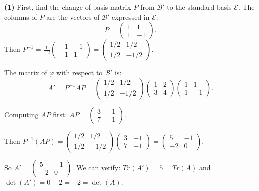 \documentclass{report}
\begin{document}
\begin{solution}
\textbf{(1)} First, find the change-of-basis matrix \(P\) from \(\mathcal{B}'\) to the standard basis \(\mathcal{E}\). The columns of \(P\) are the vectors of \(\mathcal{B}'\) expressed in \(\mathcal{E}\):
\[P = \begin{pmatrix} 1 & 1 \\ 1 & -1 \end{pmatrix}.\]
Then \(P^{-1} = \frac{1}{-2}\begin{pmatrix} -1 & -1 \\ -1 & 1 \end{pmatrix} = \begin{pmatrix} 1/2 & 1/2 \\ 1/2 & -1/2 \end{pmatrix}\).

The matrix of \(\varphi\) with respect to \(\mathcal{B}'\) is:
\[A' = P^{-1}AP = \begin{pmatrix} 1/2 & 1/2 \\ 1/2 & -1/2 \end{pmatrix} \begin{pmatrix} 1 & 2 \\ 3 & 4 \end{pmatrix} \begin{pmatrix} 1 & 1 \\ 1 & -1 \end{pmatrix}.\]

Computing \(AP\) first: \(AP = \begin{pmatrix} 3 & -1 \\ 7 & -1 \end{pmatrix}\).

Then \(P^{-1}(AP) = \begin{pmatrix} 1/2 & 1/2 \\ 1/2 & -1/2 \end{pmatrix}\begin{pmatrix} 3 & -1 \\ 7 & -1 \end{pmatrix} = \begin{pmatrix} 5 & -1 \\ -2 & 0 \end{pmatrix}\).

So \(A' = \begin{pmatrix} 5 & -1 \\ -2 & 0 \end{pmatrix}\). We can verify: \(Tr(A') = 5 = Tr(A)\) and \(\det(A') = 0 - 2 = -2 = \det(A)\). \checkmark


\end{solution}
\end{document}
